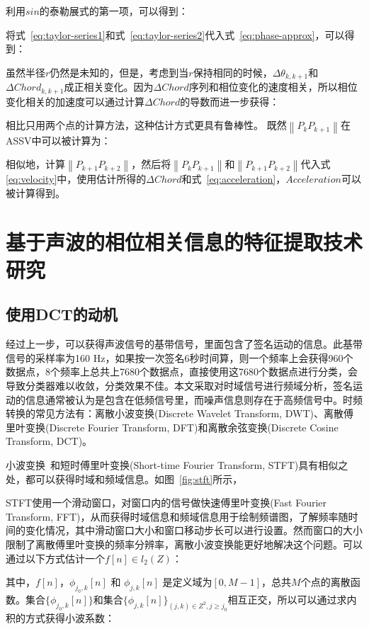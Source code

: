 利用$sin$的泰勒展式的第一项，可以得到：

将式~\eqref{eq:taylor-series1}和式~\eqref{eq:taylor-series2}代入式~\eqref{eq:phase-approx}，可以得到：

虽然半径$r$仍然是未知的，但是，考虑到当$r$保持相同的时候，$\Delta \theta_{k,k+1}$和$\Delta Chord_{k,k+1}$成正相关变化。因为$\Delta Chord$序列和相位变化的速度相关，所以相位变化相关的加速度可以通过计算$\Delta Chord$的导数而进一步获得：

相比只用两个点的计算方法，这种估计方式更具有鲁棒性。
既然$\left\|P_{k}P_{k+1}\right\|$在ASSV中可以被计算为：

相似地，计算$\left\|P_{k+1}P_{k+2}\right\|$，然后将$\left\|P_{k}P_{k+1}\right\|$和$\left\|P_{k+1}P_{k+2}\right\|$代入式\eqref{eq:velocity}中，使用估计所得的$\Delta Chord $和式~\eqref{eq:acceleration}，$Acceleration$可以被计算得到。



\section{基于声波的相位相关信息的特征提取技术研究}
\subsection{使用DCT的动机}
经过上一步，可以获得声波信号的基带信号，里面包含了签名运动的信息。此基带信号的采样率为160 Hz，如果按一次签名6秒时间算，则一个频率上会获得960个数据点，8个频率上总共上7680个数据点，直接使用这7680个数据点进行分类，会导致分类器难以收敛，分类效果不佳。本文采取对时域信号进行频域分析，签名运动的信息通常被认为是包含在低频信号里，而噪声信息则存在于高频信号中。时频转换的常见方法有：离散小波变换(Discrete Wavelet Transform, DWT)、离散傅里叶变换(Discrete Fourier Transform, DFT)和离散余弦变换(Discrete Cosine Transform, DCT)。


小波变换~\cite{chun2010tutorial}和短时傅里叶变换(Short-time Fourier Transform, STFT)具有相似之处，都可以获得时域和频域信息。如图~\ref{fig:stft}所示，

STFT使用一个滑动窗口，对窗口内的信号做快速傅里叶变换(Fast Fourier Transform, FFT)，从而获得时域信息和频域信息用于绘制频谱图，了解频率随时间的变化情况，其中滑动窗口大小和窗口移动步长可以进行设置。然而窗口的大小限制了离散傅里叶变换的频率分辨率，离散小波变换能更好地解决这个问题。可以通过以下方式估计一个$f[n] \in l_{2}(Z)$：

其中，$f[n]$，$\phi_{j_{0},k}[n]$ 和 $\phi_{j,k}[n]$ 是定义域为$[0,M-1]$，总共$M$个点的离散函数。集合$\{\phi_{j_{0},k}[n]\}$和集合$\{\phi_{j,k}[n]\}_{(j,k)\in Z^{2}, j \geq j_{0}}$相互正交，所以可以通过求内积的方式获得小波系数：

